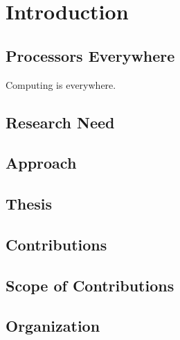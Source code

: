 \section{Introduction}   \label{chap:introduction}

\subsection{Processors Everywhere}

Computing is everywhere.


\subsection{Research Need}

\subsection{Approach}

\subsection{Thesis}



\subsection{Contributions}

\subsection{Scope of Contributions}

\subsection{Organization}